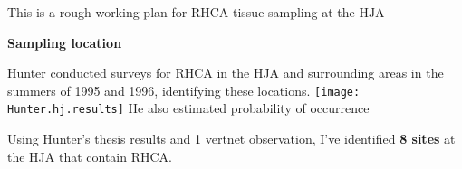 \documentclass{article}
\begin{document}
	
	This is a rough working plan for RHCA tissue sampling at the HJA
	\begin{center}
			\textbf{Sampling location}
	\end{center}

	\begin{flushleft}
		Hunter conducted surveys for RHCA in the HJA and surrounding areas in the summers of 1995 and 1996, identifying these locations.
		\texttt{[image: Hunter.hj.results]}
		He also estimated probability of occurrence
	\end{flushleft}
	
	\begin{flushleft}
		
		Using Hunter's thesis results and 1 vertnet observation, I've identified \textbf{8 sites} at the HJA that contain RHCA. 
		
	\end{flushleft}
\end{document}
